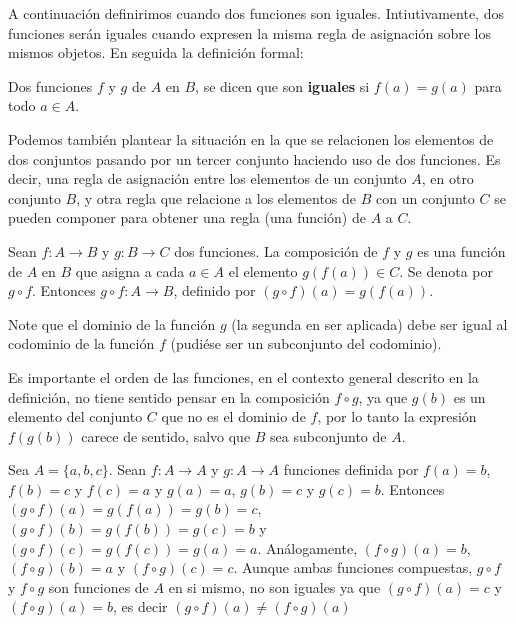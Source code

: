 \documentclass[12pt,]{krantz}
\theoremstyle{definition}
\theoremstyle{definition}
\theoremstyle{definition}
\theoremstyle{remark}
\let\BeginKnitrBlock\begin \let\EndKnitrBlock\end
\begin{document}
A continuación definirimos cuando dos funciones son iguales.
Intiutivamente, dos funciones serán iguales cuando expresen la misma
regla de asignación sobre los mismos objetos. En seguida la definición
formal:

\BeginKnitrBlock{definition}
\protect\hypertarget{def:unnamed-chunk-31}{}{\label{def:unnamed-chunk-31}
}Dos funciones \(f\) y \(g\) de \(A\) en \(B\), se dicen que son
\textbf{iguales} si \(f(a)=g(a)\) para todo \(a\in A\).
\EndKnitrBlock{definition}

Podemos también plantear la situación en la que se relacionen los
elementos de dos conjuntos pasando por un tercer conjunto haciendo uso
de dos funciones. Es decir, una regla de asignación entre los elementos
de un conjunto \(A\), en otro conjunto \(B\), y otra regla que relacione
a los elementos de \(B\) con un conjunto \(C\) se pueden componer para
obtener una regla (una función) de \(A\) a \(C\).

\BeginKnitrBlock{definition}
\protect\hypertarget{def:unnamed-chunk-32}{}{\label{def:unnamed-chunk-32}
}Sean \(f:A\longrightarrow B\) y \(g:B\longrightarrow C\) dos funciones.
La composición de \(f\) y \(g\) es una función de \(A\) en \(B\) que
asigna a cada \(a\in A\) el elemento \(g(f(a))\in C\). Se denota por
\(g\circ f\). Entonces \(g\circ f: A\longrightarrow B\), definido por
\((g\circ f)(a)=g(f(a))\).
\EndKnitrBlock{definition}

\BeginKnitrBlock{remark}
{}Note que el dominio de la función \(g\) (la
segunda en ser aplicada) debe ser igual al codominio de la función \(f\)
(pudiése ser un subconjunto del codominio).

Es importante el orden de las funciones, en el contexto general descrito
en la definición, no tiene sentido pensar en la composición
\(f\circ g\), ya que \(g(b)\) es un elemento del conjunto \(C\) que no
es el dominio de \(f\), por lo tanto la expresión \(f(g(b))\) carece de
sentido, salvo que \(B\) sea subconjunto de \(A\).
\EndKnitrBlock{remark}

\BeginKnitrBlock{example}
\protect\hypertarget{exm:unnamed-chunk-34}{}{\label{exm:unnamed-chunk-34}
}Sea \(A=\{a,b,c\}\). Sean \(f:A\longrightarrow A\) y
\(g:A\longrightarrow A\) funciones definida por \(f(a)=b\), \(f(b)=c\) y
\(f(c)=a\) y \(g(a)=a\), \(g(b)=c\) y \(g(c)=b\). Entonces
\((g\circ f)(a)=g(f(a))=g(b)=c\), \((g\circ f)(b)=g(f(b))=g(c)=b\) y
\((g\circ f)(c)=g(f(c))=g(a)=a\). Análogamente, \((f\circ g)(a)=b\),
\((f\circ g)(b)=a\) y \((f\circ g)(c)=c\). Aunque ambas funciones
compuestas, \(g\circ f\) y \(f\circ g\) son funciones de \(A\) en si
mismo, no son iguales ya que \((g\circ f)(a)=c\) y \((f\circ g)(a)=b\),
es decir \((g\circ f)(a)\neq (f\circ g)(a)\)
\EndKnitrBlock{example}
\end{document}
